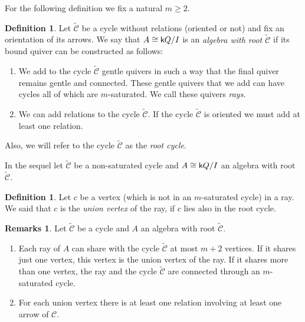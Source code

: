\documentclass{amsart}
\theoremstyle{plain}
\theoremstyle{definition}
\newtheorem{defi}[teo]{Definition}
\newtheorem{obss}[teo]{Remarks}
\begin{document}
For the following definition we fix a natural $m\geq2$.

\begin{defi}
 Let $\widetilde{\mathcal{C}}$ be a cycle without  relations (oriented or not) and fix an orientation of its arrows.  We say that   $A\cong {{\normalfont{\textsf{k}}}} Q/I$ is an  \textit{algebra with root $\widetilde{\mathcal{C}}$} if its bound quiver can be constructed  as follows:

\begin{enumerate}
\item We add to the  cycle $\widetilde{\mathcal{C}}$ gentle quivers in such a way that the final quiver remains gentle and connected. These gentle quivers that we add can have   cycles all of which are    $m$-saturated. We call these quivers  \textit{rays}.
\item We can add  relations to the  cycle $\widetilde{\mathcal{C}}$. If the cycle  $\widetilde{\mathcal{C}}$ is oriented  we must add at least one relation.\\
\end{enumerate}

Also, we will refer to the  cycle $\widetilde{\mathcal{C}}$ as the  \textit{root cycle}.
\end{defi}

In the sequel let  $\widetilde{\mathcal{C}}$  be a  non-saturated cycle and $A\cong {{\normalfont{\textsf{k}}}} Q/I$  an algebra with root $\widetilde{\mathcal{C}}$.

 \begin{defi}
 Let $c$ be a vertex (which is not in an  $m$-saturated cycle) in a ray. We said that $c$ is the  \textit{union vertex} of the ray, if $c$ lies also in the root cycle.
 \end{defi}

\begin{obss}\textnormal{Let $\widetilde{\mathcal{C}}$ be a  cycle and $A$ an algebra with root  $\widetilde{\mathcal{C}}$.}
 \begin{enumerate}
            \item \textnormal{Each ray of $A$ can share with the cycle $\widetilde{\mathcal{C}}$  at most  $m+2$ vertices. If it shares just one vertex, this vertex is the union vertex of the ray. If it shares more than one vertex, the ray and the cycle $\widetilde{\mathcal{C}}$ are connected through an  $m$-saturated cycle.}

           \item \textnormal{ For each union vertex there is at least one relation involving at least one arrow of $\mathcal{C}$. } \\ 
          \end{enumerate}

\end{obss}
\end{document}
